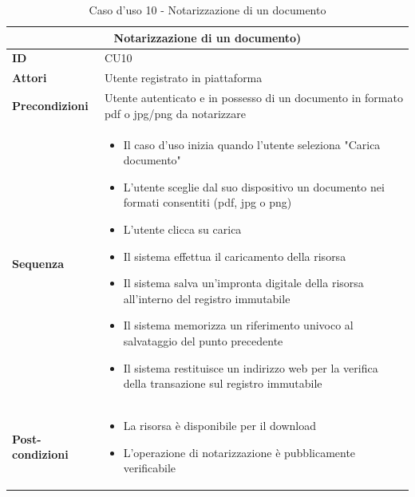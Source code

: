 \documentclass[a4paper,11pt]{article}
\begin{document}
\begin{table}[H]
  \centering
  \begin{tabular}{|m{2cm}|m{10.5cm}|}
    \hline
    \multicolumn{2}{|c|}{\textbf{Notarizzazione di un documento)}} \\ \hline
    \multicolumn{1}{|l|}{\textbf{ID}}              & CU10          \\ \hline
    \multicolumn{1}{|l|}{\textbf{Attori}}          &

    Utente registrato in piattaforma

    \\ \hline
    \multicolumn{1}{|l|}{\textbf{Precondizioni}}   &
    Utente autenticato e in possesso di un documento in formato pdf o jpg/png da notarizzare
    \\ \hline
    \multicolumn{1}{|l|}{\textbf{Sequenza}}        &

    \begin{itemize}
      \item Il caso d'uso inizia quando l'utente seleziona "Carica documento"
      \item L'utente sceglie dal suo dispositivo un documento nei formati consentiti (pdf, jpg o png)
      \item L'utente clicca su carica
      \item Il sistema effettua il caricamento della risorsa
      \item Il sistema salva un'impronta digitale della risorsa all'interno del registro immutabile
      \item Il sistema memorizza un riferimento univoco al salvataggio del punto precedente
      \item Il sistema restituisce un indirizzo web per la verifica della transazione sul registro immutabile
    \end{itemize}

    \\ \hline
    \multicolumn{1}{|l|}{\textbf{Post-condizioni}} &

    \begin{itemize}
      \item La risorsa è disponibile per il download
      \item L'operazione di notarizzazione è pubblicamente verificabile
    \end{itemize}

    \\ \hline
  \end{tabular}
  \caption{Caso d'uso 10 - Notarizzazione di un documento}
  \label{cu:CU10}
\end{table}
\end{document}
